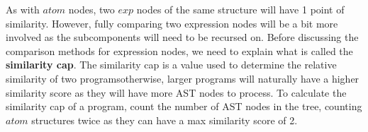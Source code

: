 \documentclass[12pt]{article}
\newcommand{\itm}[1]{\ensuremath{\mathit{#1}}}
\newcommand{\Atm}[0]{\itm{atom}}
\newcommand{\Exp}[0]{\itm{exp}}
\begin{document}
\hfill

As with \Atm{} nodes, two \Exp{} nodes of the same structure will have 1 point of similarity. However, fully comparing two expression nodes will be a bit more involved as the subcomponents will need to be recursed on. Before discussing the comparison methods for expression nodes, we need to explain what is called the \textbf{similarity cap}. The similarity cap is a value used to determine the relative similarity of two programs\textemdash otherwise, larger programs will naturally have a higher similarity score as they will have more AST nodes to process. To calculate the similarity cap of a program, count the number of AST nodes in the tree, counting \Atm{} structures twice as they can have a max similarity score of 2.

\hfill
\end{document}
